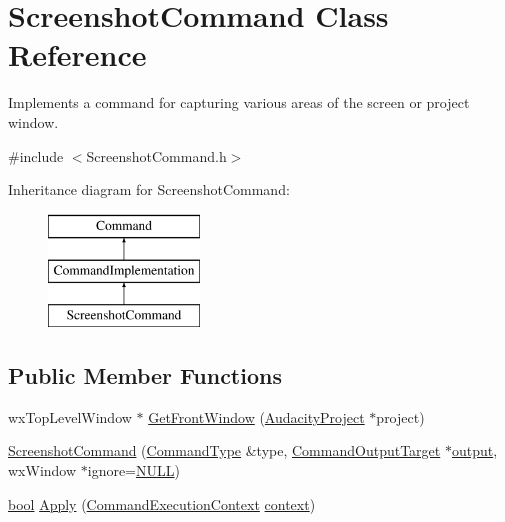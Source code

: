 \hypertarget{class_screenshot_command}{}\section{Screenshot\+Command Class Reference}
\label{class_screenshot_command}


Implements a command for capturing various areas of the screen or project window.  




{\ttfamily \#include $<$Screenshot\+Command.\+h$>$}

Inheritance diagram for Screenshot\+Command\+:\begin{figure}[H]
\begin{center}
\leavevmode
\includegraphics[height=3.000000cm]{class_screenshot_command}
\end{center}
\end{figure}
\subsection*{Public Member Functions}
\begin{DoxyCompactItemize}
\item 
wx\+Top\+Level\+Window $\ast$ \hyperlink{class_screenshot_command_a94bfdbf85529e155abc8b21d4be647c9}{Get\+Front\+Window} (\hyperlink{class_audacity_project}{Audacity\+Project} $\ast$project)
\item 
\hyperlink{class_screenshot_command_a71cefd7fc4f3eefe50e121d134795dcd}{Screenshot\+Command} (\hyperlink{class_command_type}{Command\+Type} \&type, \hyperlink{class_command_output_target}{Command\+Output\+Target} $\ast$\hyperlink{mm_8c_aeb3fcf4ab0f02cc4420e5a97568a07ef}{output}, wx\+Window $\ast$ignore=\hyperlink{px__mixer_8h_a070d2ce7b6bb7e5c05602aa8c308d0c4}{N\+U\+LL})
\item 
\hyperlink{mac_2config_2i386_2lib-src_2libsoxr_2soxr-config_8h_abb452686968e48b67397da5f97445f5b}{bool} \hyperlink{class_screenshot_command_a223faaa0341dbe0400ccf2c60f02ac64}{Apply} (\hyperlink{class_command_execution_context}{Command\+Execution\+Context} \hyperlink{structcontext}{context})
\end{DoxyCompactItemize}
